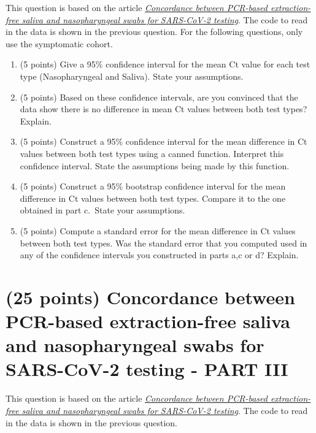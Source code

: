\documentclass[letterpaper,12pt,twoside,]{pinp}
\providecommand{\tightlist}{%
  \setlength{\itemsep}{0pt}\setlength{\parskip}{0pt}}
\begin{document}
This question is based on the article
\href{https://hrbopenresearch.org/articles/4-85/v1}{\emph{Concordance
between PCR-based extraction-free saliva and nasopharyngeal swabs for
SARS-CoV-2 testing}}. The code to read in the data is shown in the
previous question. For the following questions, only use the symptomatic
cohort.

\begin{enumerate}
\def\labelenumi{\alph{enumi}.}
\tightlist
\item
  (5 points) Give a 95\% confidence interval for the mean Ct value for
  each test type (Nasopharyngeal and Saliva). State your assumptions.\\
\item
  (5 points) Based on these confidence intervals, are you convinced that
  the data show there is no difference in mean Ct values between both
  test types? Explain.\\
\item
  (5 points) Construct a 95\% confidence interval for the mean
  difference in Ct values between both test types using a canned
  function. Interpret this confidence interval. State the assumptions
  being made by this function.\\
\item
  (5 points) Construct a 95\% bootstrap confidence interval for the mean
  difference in Ct values between both test types. Compare it to the one
  obtained in part c.~State your assumptions.\\
\item
  (5 points) Compute a standard error for the mean difference in Ct
  values between both test types. Was the standard error that you
  computed used in any of the confidence intervals you constructed in
  parts a,c or d? Explain.
\end{enumerate}

\newpage

\hypertarget{points-concordance-between-pcr-based-extraction-free-saliva-and-nasopharyngeal-swabs-for-sars-cov-2-testing---part-iii}{%
\section{(25 points) Concordance between PCR-based extraction-free
saliva and nasopharyngeal swabs for SARS-CoV-2 testing - PART
III}\label{points-concordance-between-pcr-based-extraction-free-saliva-and-nasopharyngeal-swabs-for-sars-cov-2-testing---part-iii}}

This question is based on the article
\href{https://hrbopenresearch.org/articles/4-85/v1}{\emph{Concordance
between PCR-based extraction-free saliva and nasopharyngeal swabs for
SARS-CoV-2 testing}}. The code to read in the data is shown in the
previous question.
\end{document}

